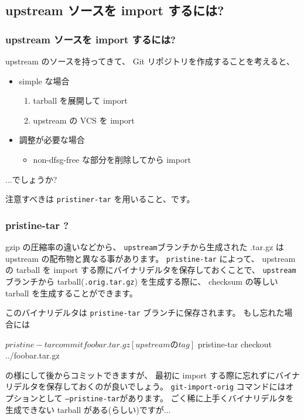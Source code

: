\documentclass[mingoth,a4paper]{jsarticle}
\begin{document}
\subsection*{upstream ソースを import するには?}
\subsubsection*{upstream ソースを import するには?}

upstream のソースを持ってきて、
Git リポジトリを作成することを考えると、
\begin{itemize}
\item simple な場合
  \begin{enumerate}
  \item tarball を展開して import
  \item upstream の VCS を import
  \end{enumerate}
\item 調整が必要な場合
  \begin{itemize}
  \item non-dfsg-free な部分を削除してから import
  \end{itemize}
\end{itemize}
...でしょうか?

注意すべきは \texttt{pristiner-tar} を用いること、です。

\subsubsection*{pristine-tar ?}

gzip の圧縮率の違いなどから、
\texttt{upstream}ブランチから生成された .tar.gz は upstream の配布物と異なる事があります。
\texttt{pristine-tar} によって、
upstream の tarball を import する際にバイナリデルタを保存しておくことで、
\texttt{upstream} ブランチから tarball(\texttt{.orig.tar.gz}) を生成する際に、
checksum の等しい tarball を生成することができます。

このバイナリデルタは \texttt{pristine-tar} ブランチに保存されます。
もし忘れた場合には
\begin{commandline}
  $ pristine-tar commit foobar.tar.gz [upstream の tag]
  $ pristine-tar checkout ../foobar.tar.gz
\end{commandline}
の様にして後からコミットできますが、
最初に import する際に忘れずにバイナリデルタを保存しておくのが良いでしょう。
\texttt{git-import-orig} コマンドにはオプションとして \texttt{--pristine-tar}があります。
ごく稀に上手くバイナリデルタを生成できない tarball がある(らしい)ですが...
\end{document}
